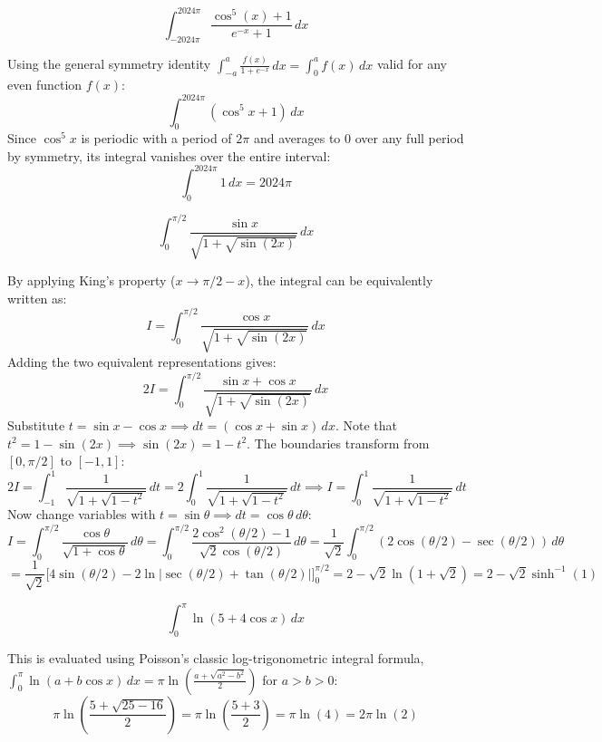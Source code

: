 \begin{questions}
    \question \[ \int_{-2024\pi}^{2024\pi} \frac{\cos^5(x) + 1}{e^{-x} + 1} \,dx \]
    \begin{solution}
        Using the general symmetry identity $\int_{-a}^{a} \frac{f(x)}{1+e^{-x}} \,dx = \int_{0}^{a} f(x) \,dx$ valid for any even function $f(x)$:
        \[ \int_{0}^{2024\pi} (\cos^5 x + 1) \,dx \]
        Since $\cos^5 x$ is periodic with a period of $2\pi$ and averages to $0$ over any full period by symmetry, its integral vanishes over the entire interval:
        \[ \int_{0}^{2024\pi} 1 \,dx = 2024\pi \]
    \end{solution}

    \question \[ \int_{0}^{\pi/2} \frac{\sin x}{\sqrt{1 + \sqrt{\sin(2x)}}} \,dx \]
    \begin{solution}
        By applying King's property ($x \to \pi/2 - x$), the integral can be equivalently written as:
        \[ I = \int_{0}^{\pi/2} \frac{\cos x}{\sqrt{1 + \sqrt{\sin(2x)}}} \,dx \]
        Adding the two equivalent representations gives:
        \[ 2I = \int_{0}^{\pi/2} \frac{\sin x + \cos x}{\sqrt{1 + \sqrt{\sin(2x)}}} \,dx \]
        Substitute $t = \sin x - \cos x \implies dt = (\cos x + \sin x) \,dx$. Note that $t^2 = 1 - \sin(2x) \implies \sin(2x) = 1 - t^2$. The boundaries transform from $[0, \pi/2]$ to $[-1, 1]$:
        \[ 2I = \int_{-1}^{1} \frac{1}{\sqrt{1 + \sqrt{1-t^2}}} \,dt = 2\int_{0}^{1} \frac{1}{\sqrt{1 + \sqrt{1-t^2}}} \,dt \implies I = \int_{0}^{1} \frac{1}{\sqrt{1 + \sqrt{1-t^2}}} \,dt \]
        Now change variables with $t = \sin\theta \implies dt = \cos\theta \,d\theta$:
        \[ I = \int_{0}^{\pi/2} \frac{\cos\theta}{\sqrt{1+\cos\theta}} \,d\theta = \int_{0}^{\pi/2} \frac{2\cos^2(\theta/2)-1}{\sqrt{2}\cos(\theta/2)} \,d\theta = \frac{1}{\sqrt{2}}\int_{0}^{\pi/2} \left( 2\cos(\theta/2) - \sec(\theta/2) \right) \,d\theta \]
        \[ = \frac{1}{\sqrt{2}} \Big[ 4\sin(\theta/2) - 2\ln|\sec(\theta/2)+\tan(\theta/2)| \Big]_0^{\pi/2} = 2 - \sqrt{2}\ln(1+\sqrt{2}) = 2 - \sqrt{2}\sinh^{-1}(1) \]
    \end{solution}

    \question \[ \int_{0}^{\pi} \ln(5 + 4\cos x) \,dx \]
    \begin{solution}
        This is evaluated using Poisson's classic log-trigonometric integral formula, $\int_{0}^{\pi} \ln(a + b\cos x) \,dx = \pi\ln\left(\frac{a + \sqrt{a^2-b^2}}{2}\right)$ for $a > b > 0$:
        \[ \pi \ln\left(\frac{5 + \sqrt{25 - 16}}{2}\right) = \pi \ln\left(\frac{5+3}{2}\right) = \pi\ln(4) = 2\pi\ln(2) \]
    \end{solution}
\end{questions}


